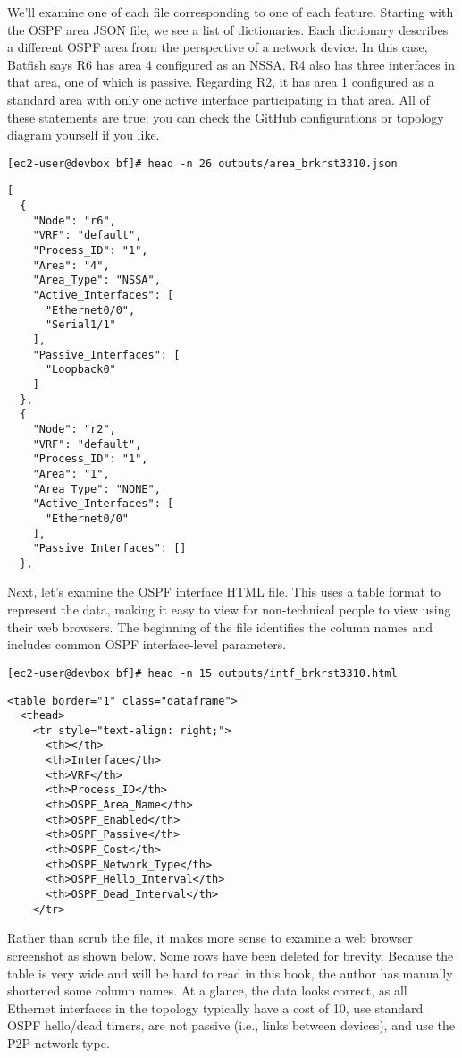 We'll examine one of each file corresponding to one of each feature. Starting
with the OSPF area JSON file, we see a list of dictionaries. Each dictionary
describes a different OSPF area from the perspective of a network device.
In this case, Batfish says R6 has area 4 configured as an NSSA\@. R4 also has
three interfaces in that area, one of which is passive. Regarding R2, it
has area 1 configured as a standard area with only one active interface
participating in that area. All of these statements are true; you can
check the GitHub configurations or topology diagram yourself if you like.

\begin{verbatim}
[ec2-user@devbox bf]# head -n 26 outputs/area_brkrst3310.json
\end{verbatim}

\begin{verbatim}
[
  {
    "Node": "r6",
    "VRF": "default",
    "Process_ID": "1",
    "Area": "4",
    "Area_Type": "NSSA",
    "Active_Interfaces": [
      "Ethernet0/0",
      "Serial1/1"
    ],
    "Passive_Interfaces": [
      "Loopback0"
    ]
  },
  {
    "Node": "r2",
    "VRF": "default",
    "Process_ID": "1",
    "Area": "1",
    "Area_Type": "NONE",
    "Active_Interfaces": [
      "Ethernet0/0"
    ],
    "Passive_Interfaces": []
  },
\end{verbatim}

Next, let's examine the OSPF interface HTML file. This uses a table format to
represent the data, making it easy to view for non-technical people to view
using their web browsers. The beginning of the file identifies the column
names and includes common OSPF interface-level parameters.

\begin{verbatim}
[ec2-user@devbox bf]# head -n 15 outputs/intf_brkrst3310.html
\end{verbatim}

\begin{verbatim}
<table border="1" class="dataframe">
  <thead>
    <tr style="text-align: right;">
      <th></th>
      <th>Interface</th>
      <th>VRF</th>
      <th>Process_ID</th>
      <th>OSPF_Area_Name</th>
      <th>OSPF_Enabled</th>
      <th>OSPF_Passive</th>
      <th>OSPF_Cost</th>
      <th>OSPF_Network_Type</th>
      <th>OSPF_Hello_Interval</th>
      <th>OSPF_Dead_Interval</th>
    </tr>
\end{verbatim}

Rather than scrub the file, it makes more sense to examine a web browser
screenshot as shown below. Some rows have been deleted for brevity.
Because the table is very wide and will be hard to read in this book, the
author has manually shortened some column names. At a glance, the data
looks correct, as all Ethernet interfaces in the topology typically have
a cost of 10, use standard OSPF hello/dead timers, are not passive
(i.e., links between devices), and use the P2P network type.

